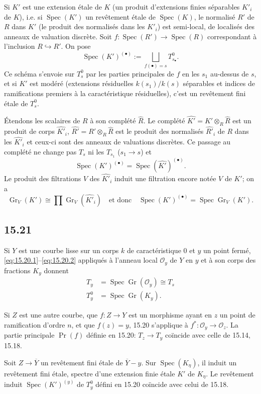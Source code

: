 \documentclass[12pt,a4paper]{article}
\theoremstyle{plain}
\theoremstyle{definition}
\theoremstyle{remark}
\DeclareMathOperator{\Spec}{Spec}
\DeclareMathOperator{\Gr}{Gr}
\newcommand{\cO}{\mathcal{O}}
\begin{document}
Si $K'$ est une extension étale de $K$ (un produit d'extensions finies séparables $K'_i$ de $K$), i.e. si $\Spec(K')$ un revêtement étale de $\Spec(K)$, le normalisé $R'$ de $R$ dans $K'$ (le produit des normalisés dans les $K'_i$) est semi-local, de localisés des anneaux de valuation discrète. Soit $f: \Spec(R') \to \Spec(R)$ correspondant à l'inclusion $R \hookrightarrow R'$. On pose
\[
\Spec(K')^{(\bullet)} := \bigsqcup_{f(\bullet) = s} T_{s_\bullet}^0.
\]
Ce schéma s'envoie sur $T_s^0$ par les parties principales de $f$ en les $s_1$ au-dessus de $s$, et si $K'$ est modéré (extensions résiduelles $k(s_1)/k(s)$ séparables et indices de ramifications premiers à la caractéristique résiduelles), c'est un revêtement fini étale de $T_s^0$.

Étendons les scalaires de $R$ à son complété $\hat{R}$. Le complété $\widehat{K'} = K' \otimes_R \hat{R}$ est un produit de corps $\widehat{K'}_i$, $\widehat{R'} = R' \otimes_R \hat{R}$ est le produit des normalisés $\widehat{R'}_i$ de $R$ dans les $\widehat{K'}_i$ et ceux-ci sont des anneaux de valuations discrètes. Ce passage au complété ne change pas $T_s$ ni les $T_{s_1}$ ($s_1 \to s$) et
\[
\Spec(K')^{(\bullet)} = \Spec(\widehat{K'})^{(\bullet)}.
\]
Le produit des filtrations $V$ des $\widehat{K'}_i$ induit une filtration encore notée $V$ de $K'$; on a
\[
\Gr_V(K') \cong \prod \Gr_V(\widehat{K'}_i) \quad \text{et donc} \quad \Spec(K')^{(\bullet)} = \Spec \Gr_V(K').
\]

\subsection*{15.21}

Si $Y$ est une courbe lisse sur un corps $k$ de caractéristique $0$ et $y$ un point fermé, \eqref{eq:15.20.1}--\eqref{eq:15.20.2} appliqués à l'anneau local $\cO_y$ de $Y$ en $y$ et à son corps des fractions $K_y$ donnent
\begin{align*}
T_y &= \Spec \Gr(\cO_y) \cong T_s \\
T_y^0 &= \Spec \Gr(K_y).
\end{align*}

Si $Z$ est une autre courbe, que $f: Z \to Y$ est un morphisme ayant en $z$ un point de ramification d'ordre $n$, et que $f(z) = y$, 15.20 s'applique à $f^*: \cO_y \to \cO_z$. La partie principale $\Pr(f)$ définie en 15.20: $T_z \to T_y$ coïncide avec celle de 15.14, 15.18.

Soit $Z \to \overline{Y}$ un revêtement fini étale de $\overline{Y} - y$. Sur $\Spec(K_\eta)$, il induit un revêtement fini étale, spectre d'une extension finie étale $K'$ de $K_\eta$. Le revêtement induit $\Spec(K')^{(y)}$ de $T_y^0$ défini en 15.20 coïncide avec celui de 15.18.
\end{document}
